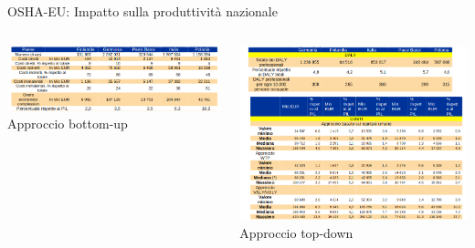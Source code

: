 \documentclass{beamer}
\begin{document}
\begin{frame}{OSHA-EU: Impatto sulla produttività nazionale}

  \begin{columns}  
    \begin{column}{0.5\textwidth}
      \centering
      \includegraphics[width=\textwidth]{images/onere_infortuni_ba.png}
      \vspace{2mm}
      \small{Approccio bottom-up}
    \end{column}

    \begin{column}{0.5\textwidth}
      \centering
      \includegraphics[width=\textwidth]{images/onere_infortuni_td.png}
      \vspace{2mm}
      \small{Approccio top-down}
    \end{column}
  \end{columns}
\end{frame}
\end{document}
